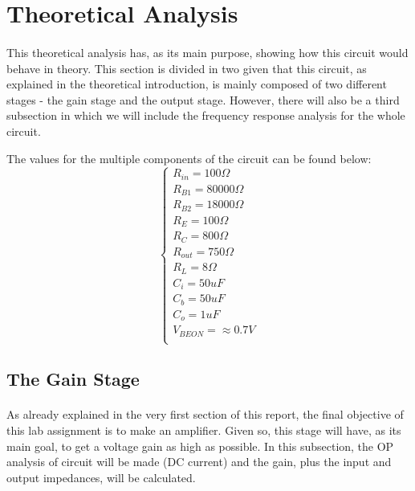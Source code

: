 \section{Theoretical Analysis}
\label{analysis}

\paragraph{}
This theoretical analysis has, as its main purpose, showing how this circuit would behave in theory. This section is divided in two given that this circuit, as explained in the theoretical introduction, is mainly composed of two different stages - the gain stage and the output stage. However, there will also be a third subsection in which we will include the frequency response analysis for the whole circuit.

The values for the multiple components of the circuit can be found below:
\[ 
\left\{\begin{matrix}
	R_{in}= 100 \Omega\\	
	R_{B1}= 80000 \Omega\\
	R_{B2}= 18000 \Omega\\
	R_E= 100\Omega\\
	R_C= 800\Omega\\
	R_{out}= 750 \Omega\\
	R_L= 8\Omega\\
	C_i=50 uF\\
	C_b=50 uF\\
	C_o=1 uF\\
	
	V_{BEON}=\approx 0.7 V\\
\end{matrix}\right.
\]

\subsection{The Gain Stage}

\paragraph{}As already explained in the very first section of this report, the final objective of this lab assignment is to make an amplifier. Given so, this stage will have, as its main goal, to get a voltage gain as high as possible. In this subsection, the OP analysis of circuit will be made (DC current) and the gain, plus the input and output impedances,  will be calculated.



